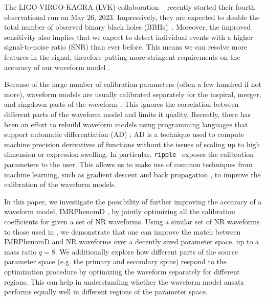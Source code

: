 \documentclass[twocolumn]{aastex631}
\newcommand{\ripple}{\texttt{ripple}}
\begin{document}
The LIGO-VIRGO-KAGRA (LVK) collaboration
~\citep{LIGOScientific:2014pky,LIGOScientific:2021usb,LIGOScientific:2021djp,
VIRGO:2014yos,KAGRA:2020tym} recently started their fourth observational
run on May 26, 2023. Impressively, they are
expected to double the total number of observed binary black holes (BBHs)~\citep{abbott2020prospects}.
Moreover, the improved sensitivity also implies that we expect to
detect individual events with a higher signal-to-noise ratio (SNR) than ever before. This means
we can resolve more features in the signal, therefore putting more
stringent requirements on the accuracy of our waveform model \citep{purrer2020gravitational, hu2022assessing}.

Because of the large number of calibration parameters (often a few hundred if not
more), waveform models are usually calibrated separately for the inspiral, merger,
and ringdown parts of the waveform \citep{khan2016frequency, 
santamaria2010matching, pratten2021computationally}. This
ignores the correlation between different parts of the waveform model and limits
it quality. Recently, there has been an effort to rebuild waveform models
\citep{khan2016frequency} using programming languages that support automatic differentiation (AD) 
\citep{ripple, Iacovelli:2022bbs, Iacovelli:2022mbg, Coogan:2022qxs}; AD is a technique 
used to compute machine precision derivatives of functions 
without the issues of scaling up to high dimension or expression swelling. In
particular, \ripple~\citep{ripple} exposes the calibration parameters to the
user. This allows us to make use of common techniques from
machine learning, such as gradient descent and back propagation \citep{jax2018github, 
pytorch, tensorflow2015}, to improve the calibration of the waveform models.

In this paper, we investigate the possibility of further improving the accuracy
of a waveform model, IMRPhenomD \citep{khan2016frequency, husa2016frequency}, by jointly optimizing all the
calibration coefficients for given a set of NR waveforms. Using a similar set of NR
waveforms to those used in \citep{khan2016frequency, husa2016frequency},
we demonstrate that one can improve the match between IMRPhenomD and NR
waveforms over a decently sized parameter space, up to a mass ratio $q=8$. We additionally
explore how different parts of the source parameter space (e.g. the primary and
secondary spins) respond to the optimization procedure by optimizing the waveform
separately for different regions. This can help in understanding
whether the waveform model ansatz performs equally well in different regions of the
parameter space.
\end{document}
